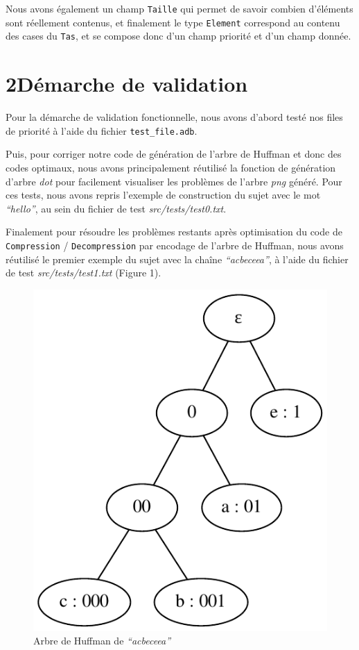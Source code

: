 \documentclass [a4paper,11pt] {report}
\begin{document}
Nous avons également un champ \lstinline!Taille! qui permet de savoir combien d'éléments sont réellement contenus, et finalement le type \lstinline!Element! correspond au contenu des cases du \lstinline!Tas!, et se compose donc d'un champ priorité et d'un champ donnée.





\section* {2\hspace{5mm}Démarche de validation }

Pour la démarche de validation fonctionnelle, nous avons d'abord testé nos files de priorité à l'aide du fichier \lstinline!test_file.adb!.

Puis, pour corriger notre code de génération de l'arbre de Huffman et donc des codes optimaux, nous avons principalement réutilisé la fonction de génération d'arbre \textit{dot} pour facilement visualiser les problèmes de l'arbre \textit{png} généré. Pour ces tests, nous avons repris l'exemple de construction du sujet avec le mot \textit{``hello''}, au sein du fichier de test \textit{src/tests/test0.txt}.

\newpage

Finalement pour résoudre les problèmes restants après optimisation du code de \lstinline!Compression! / \lstinline!Decompression! par encodage de l'arbre de Huffman, nous avons réutilisé le premier exemple du sujet avec la chaîne \textit{``acbeceea''}, à l'aide du fichier de test \textit{src/tests/test1.txt} (Figure 1).

\begin{figure}[ht]
\begin{center}
  \includegraphics[scale=0.75]{test1.pdf}
 \caption{Arbre de Huffman de \textit{``acbeceea''}}
\end{center}
\end{figure}
\end{document}
